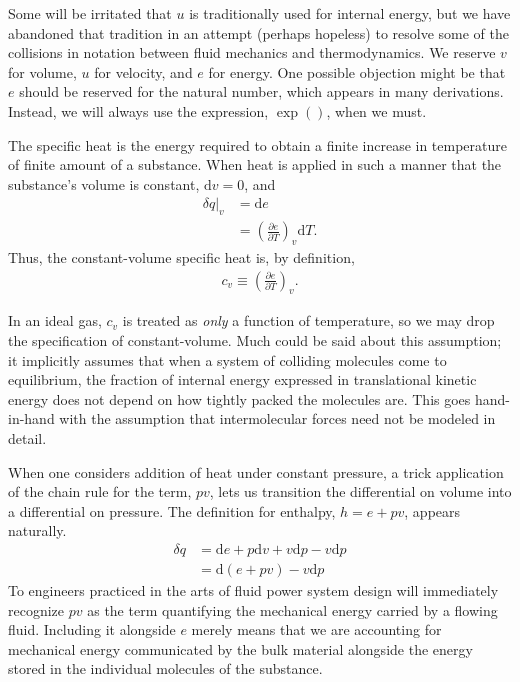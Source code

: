 \documentclass[letterpaper,11pt]{article}
\def\d{\mathrm{d}}
\begin{document}
Some will be irritated that $u$ is traditionally used for internal energy, but we have abandoned that tradition in an attempt (perhaps hopeless) to resolve some of the collisions in notation between fluid mechanics and thermodynamics.  We reserve $v$ for volume, $u$ for velocity, and $e$ for energy.  One possible objection might be that $e$ should be reserved for the natural number, which appears in many derivations.  Instead, we will always use the expression, $\exp()$, when we must.

The specific heat is the energy required to obtain a finite increase in temperature of finite amount of a substance.  When heat is applied in such a manner that the substance's volume is constant, $\d v = 0$, and
\begin{align}
\delta q |_v &= \d e\nonumber\\
 &= \left(\frac{\partial e}{\partial T}\right)_v \d T.
\end{align}
Thus, the constant-volume specific heat is, by definition, 
\begin{align}
c_v \equiv \left(\frac{\partial e}{\partial T}\right)_v.
\end{align}

In an ideal gas, $c_v$ is treated as \emph{only} a function of temperature, so we may drop the specification of constant-volume.  Much could be said about this assumption; it implicitly assumes that when a system of colliding molecules come to equilibrium, the fraction of internal energy expressed in translational kinetic energy does not depend on how tightly packed the molecules are.  This goes hand-in-hand with the assumption that intermolecular forces need not be modeled in detail.

When one considers addition of heat under constant pressure, a trick application of the chain rule for the term, $pv$, lets us transition the differential on volume into a differential on pressure.  The definition for enthalpy, $h=e+pv$, appears naturally.
\begin{align}
\delta q &= \d e + p \d v + v\d p - v \d p\nonumber\\
 &= \d(e + pv) - v\d p
\end{align}
To engineers practiced in the arts of fluid power system design will immediately recognize $pv$ as the term quantifying the mechanical energy carried by a flowing fluid.  Including it alongside $e$ merely means that we are accounting for mechanical energy communicated by the bulk material alongside the energy stored in the individual molecules of the substance.
\end{document}
